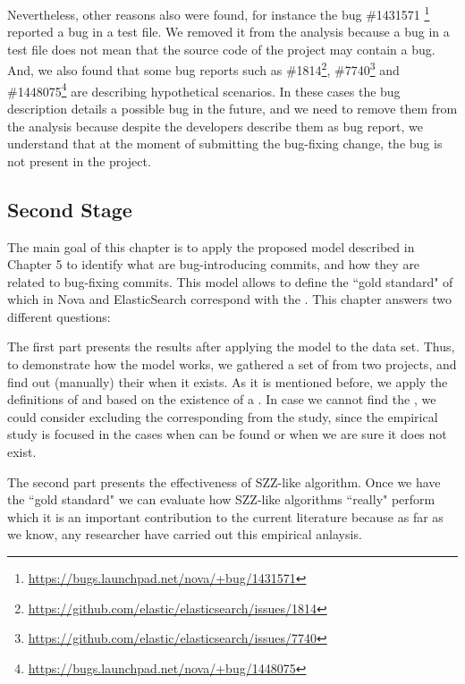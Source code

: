 \documentclass[a4paper, 12pt]{book}
\begin{document}
Nevertheless, other reasons also were found, for instance the bug \#1431571 \footnote{\url{https://bugs.launchpad.net/nova/+bug/1431571}} reported a bug in a test file. We removed it from the analysis because a bug in a test file does not mean that the source code of the project may contain a bug. And, we also found that some bug reports such as \#1814\footnote{\url{https://github.com/elastic/elasticsearch/issues/1814}}, \#7740\footnote{\url{https://github.com/elastic/elasticsearch/issues/7740}} and \#1448075\footnote{\url{https://bugs.launchpad.net/nova/+bug/1448075}} are describing hypothetical scenarios. In these cases the bug description details a possible bug in the future, and we need to remove them from the analysis because despite the developers describe them as bug report, we understand that at the moment of submitting the bug-fixing change, the bug is not present in the project. 

\subsection{Second Stage}
\label{sec:resultsSS}

The main goal of this chapter is to apply the proposed model described in Chapter 5 to identify what are bug-introducing commits, and how they are related to bug-fixing commits. This model allows to define the ``gold standard" of which \BIC in Nova and ElasticSearch correspond with the \BFC. This chapter answers two different questions:

The first part presents the results after applying the model to the data set. Thus, to demonstrate how the model works, we gathered a set of \BFC from two projects, and find out (manually) their \BIC when it exists. As it is mentioned before, we apply the definitions of \BIC and \BFC based on the existence of a \TSB. In case we cannot find the \BIC, we could consider excluding the corresponding \BFC from the study, since the empirical study is focused in the cases when \BIC can be found or when we are sure it does not exist. 

The second part presents the effectiveness of SZZ-like algorithm. Once we have the ``gold standard" we can evaluate how SZZ-like algorithms ``really" perform which it is an important contribution to the current literature because as far as we know, any researcher have carried out this empirical anlaysis. 
\end{document}
